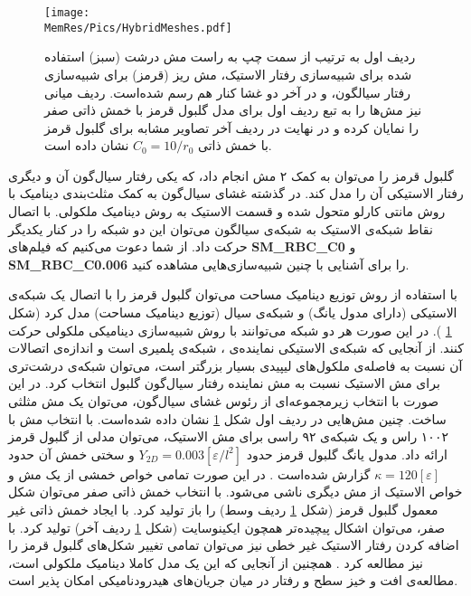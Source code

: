 \begin{figure}[htbp]
\begin{center}
\texttt{[image: \\MemRes/Pics/HybridMeshes.pdf]}
\caption{
ردیف اول به ترتیب از سمت چپ به راست مش‌ درشت (سبز)  استفاده شده برای شبیه‌سازی رفتار الاستیک، مش ریز (قرمز) برای شبیه‌سازی رفتار سیالگون، و در آخر دو غشا کنار هم رسم شده‌است. ردیف میانی نیز مش‌ها را به تبع ردیف اول برای 
مدل گلبول قرمز با خمش ذاتی صفر را نمایان کرده و در نهایت در ردیف آخر تصاویر مشابه برای گلبول قرمز با خمش ذاتی 
$C_0=10/r_0$
نشان داده است.
}
\label{fig:hybridMeshes}
\end{center}
\end{figure}

 گلبول قرمز را می‌توان به کمک ۲ مش انجام داد، که یکی رفتار سیال‌گون آن  و دیگری رفتار الاستیکی آن را مدل کند. در گذشته غشای سیال‌گون به کمک مثلث‌بندی دینامیک با روش مانتی کارلو متحول شده و قسمت الاستیک به روش دینامیک ملکولی. با اتصال نقاط شبکه‌ی الاستیک به شبکه‌ی سیالگون می‌توان این دو شبکه را در کنار یکدیگر حرکت داد. از شما دعوت می‌کنیم که فیلم‌های
 {\bf  SM\_RBC\_C0}
 و
 {\bf SM\_RBC\_C0.006}
 را برای آشنایی با چنین شبیه‌سازی‌هایی مشاهده کنید.

با استفاده از روش توزیع دینامیک مساحت می‌توان گلبول قرمز را با اتصال یک شبکه‌ی الاستیکی (دارای مدول یانگ) و شبکه‌ی سیال‌ (توزیع دینامیک مساحت) مدل کرد (شکل
\ref{fig:hybridMeshes}
).  در این صورت هر دو شبکه می‌توانند با روش شبیه‌سازی دینامیکی ملکولی حرکت کنند. از آنجایی که شبکه‌ی الاستیکی نماینده‌ی ، شبکه‌ی پلمیری است و اندازه‌ی اتصالات آن نسبت به فاصله‌ی ملکول‌های لیپیدی بسیار بزرگتر است، می‌توان شبکه‌ی درشت‌تری برای مش الاستیک نسبت به مش نماینده رفتار سیال‌گون گلبول انتخاب کرد. در این صورت با انتخاب زیرمجموعه‌ای از رئوس غشای سیال‌گون، می‌توان یک مش مثلثی ساخت. چنین مش‌هایی در ردیف اول شکل
\ref{fig:hybridMeshes}
نشان داده ‌شده‌است. با انتخاب مش با ۱۰۰۲ راس و یک شبکه‌ی ۹۲ راسی برای مش الاستیک، می‌توان مدلی از گلبول قرمز ارائه داد. مدول یانگ گلبول قرمز حدود 
$Y_{2D}=0.003 [\varepsilon/l^2]$
 و سختی خمش آن حدود
$\kappa=120 [\varepsilon]$ 
گزارش شده‌است
\cite{gomppernelson2012}
. در این صورت تمامی خواص خمشی از یک مش و خواص الاستیک از مش دیگری ناشی می‌شود. با انتخاب خمش ذاتی صفر می‌توان شکل معمول گلبول قرمز (شکل 
\ref{fig:hybridMeshes}
ردیف وسط) را باز تولید کرد. با ایجاد خمش ذاتی غیر صفر، می‌توان اشکال پیچیده‌تر همچون ایکینوسایت 
(شکل
\ref{fig:hybridMeshes}
ردیف آخر) تولید کرد. با اضافه کردن رفتار الاستیک غیر خطی نیز می‌توان تمامی تغییر شکل‌های گلبول قرمز را نیز مطالعه کرد
\cite{Lim2002PNAS, Noguchi2005PNAS}
. همچنین از آنجایی که این یک مدل کاملا دینامیک ملکولی‌ است، مطالعه‌ی افت و خیز سطح و رفتار در میان جریان‌های هیدرودنامیکی امکان پذیر است.






